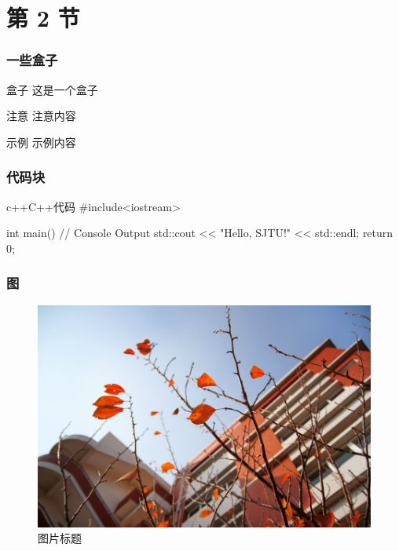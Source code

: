 \documentclass[
    aspectratio=169,                   %
]{beamer}
\begin{document}
\section{第 2 节}
    \begin{frame}
        \frametitle{一些盒子}
        
        \begin{block}{盒子}
            这是一个盒子\cite{beamerman}
        \end{block}

        \begin{alertblock}{注意}
            注意内容
        \end{alertblock}

        \begin{exampleblock}{示例}
            示例内容
        \end{exampleblock}
    \end{frame}

    \begin{frame}[fragile]          %
        \frametitle{代码块}
        \begin{codeblock}{c++}{C++代码}
#include<iostream>

int main(){
    // Console Output
    std::cout << "Hello, SJTU!" << std::endl;
    return 0;
}
        \end{codeblock}
    \end{frame}

    \begin{frame}
        \frametitle{图}
        \begin{figure}
            \centering
            \begin{stampbox}
                \includegraphics[height=0.3\textheight]{vi/plant.jpg}
            \end{stampbox}
            \caption{图片标题\cite{viman}}
        \end{figure}
    \end{frame}
\end{document}
